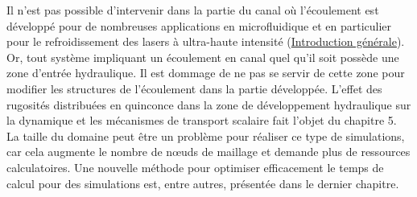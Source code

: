 Il n’est pas possible d'intervenir dans la partie du canal où l'écoulement est développé pour de nombreuses applications en microfluidique et en particulier pour le refroidissement des lasers à ultra-haute intensité (\hyperref[ch/introduction]{Introduction générale}). Or, tout système impliquant un écoulement en canal quel qu'il soit possède une zone d'entrée hydraulique. Il est dommage de ne pas se servir de cette zone pour modifier les structures de l'écoulement dans la partie développée. L'effet des rugosités distribuées en quinconce dans la zone de développement hydraulique sur la dynamique et les mécanismes de transport scalaire fait l'objet du chapitre 5. La taille du domaine peut être un problème pour réaliser ce type de simulations, car cela augmente le nombre de nœuds de maillage et demande plus de ressources calculatoires. Une nouvelle méthode pour optimiser efficacement le temps de calcul pour des simulations est, entre autres, présentée dans le dernier chapitre.
